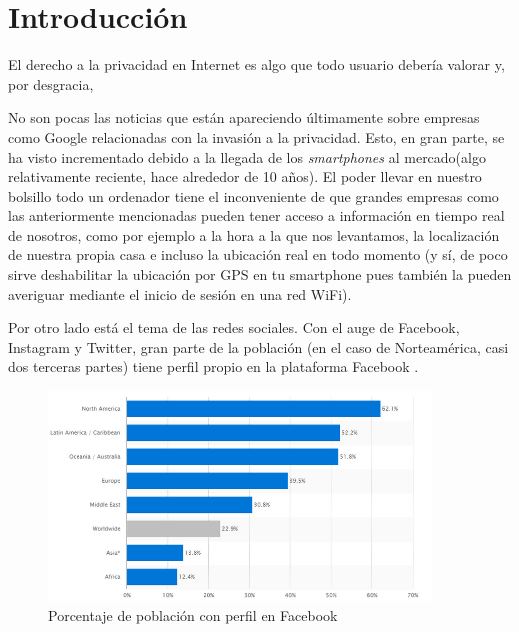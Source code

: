 \chapter{Introducción} 
\label{chap:intro}

\vspace{-0.2cm}

El derecho a la privacidad en Internet es algo que todo usuario
debería valorar y, por desgracia, 

No son pocas las noticias que están apareciendo últimamente sobre
empresas como Google relacionadas con la invasión a la
privacidad. Esto, en gran parte, se ha visto incrementado debido a la
llegada de los \textit{smartphones} al mercado(algo relativamente
reciente, hace alrededor de 10 años). El poder llevar en nuestro
bolsillo todo un ordenador tiene el inconveniente de que grandes
empresas como las anteriormente mencionadas pueden tener acceso a
información en tiempo real de nosotros, como por ejemplo a la hora a
la que nos levantamos, la localización de nuestra propia casa e
incluso la ubicación real en todo momento (y sí, de poco sirve
deshabilitar la ubicación por GPS en tu smartphone pues también la
pueden averiguar mediante el inicio de sesión en una red WiFi).

Por otro lado está el tema de las redes sociales. Con el auge de
Facebook, Instagram y Twitter, gran parte de la población (en el caso
de Norteamérica, casi dos terceras partes) tiene perfil propio en la
plataforma Facebook .

\begin{figure}[h]
	\centerline{
		\mbox{\includegraphics[width=4.00in]{images/sn.png}}
	}
	\caption{Porcentaje de población con perfil en Facebook~\cite{article:FacebookStats} }
	\label{fig:norm_Daugman}
\end{figure}

